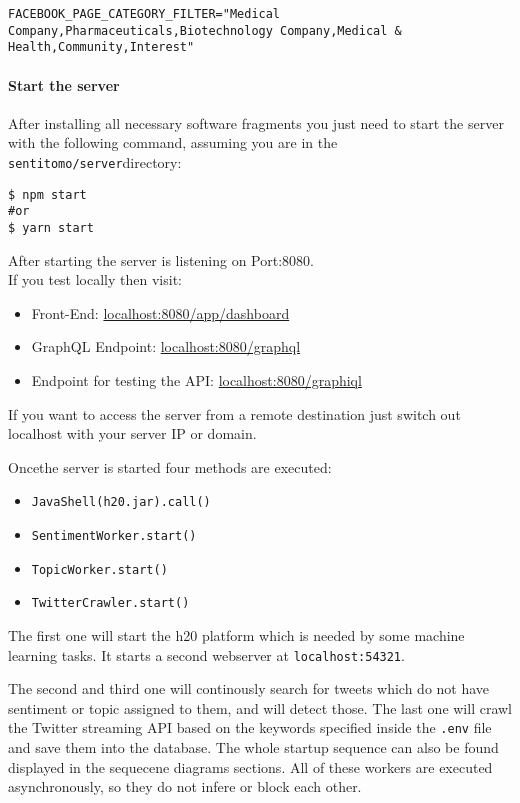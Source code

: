 \documentclass[]{article}
\providecommand{\tightlist}{%
  \setlength{\itemsep}{0pt}\setlength{\parskip}{0pt}}
\let\oldparagraph\paragraph
\renewcommand{\paragraph}[1]{\oldparagraph{#1}\mbox{}}
\begin{document}
\begin{verbatim}
FACEBOOK_PAGE_CATEGORY_FILTER="Medical Company,Pharmaceuticals,Biotechnology Company,Medical & Health,Community,Interest"
\end{verbatim}

\paragraph{Start the server}\label{start-the-server}

After installing all necessary software fragments you just need to start
the server with the following command, assuming you are in the
\texttt{sentitomo/server}directory:

\begin{verbatim}
$ npm start
#or 
$ yarn start
\end{verbatim}

After starting the server is listening on Port:8080.\\
If you test locally then visit:

\begin{itemize}
\tightlist
\item
  Front-End: \url{localhost:8080/app/dashboard}
\item
  GraphQL Endpoint: \url{localhost:8080/graphql}
\item
  Endpoint for testing the API: \url{localhost:8080/graphiql}
\end{itemize}

If you want to access the server from a remote destination just switch
out localhost with your server IP or domain.

Oncethe server is started four methods are executed:

\begin{itemize}
\tightlist
\item
  \texttt{JavaShell(\textquotesingle{}h20.jar\textquotesingle{}).call()}
\item
  \texttt{SentimentWorker.start()}
\item
  \texttt{TopicWorker.start()}
\item
  \texttt{TwitterCrawler.start()}
\end{itemize}

The first one will start the h20 platform which is needed by some
machine learning tasks. It starts a second webserver at
\texttt{localhost:54321}.

The second and third one will continously search for tweets which do not
have sentiment or topic assigned to them, and will detect those. The
last one will crawl the Twitter streaming API based on the keywords
specified inside the \texttt{.env} file and save them into the database.
The whole startup sequence can also be found displayed in the sequecene
diagrams sections. All of these workers are executed asynchronously, so
they do not infere or block each other.
\end{document}
